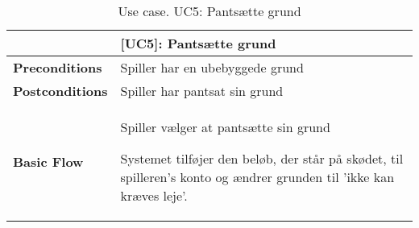 \documentclass[class=article, crop=false]{standalone}
\begin{document}
    \begin{table}[H]
        \caption{Use case. UC5: Pantsætte grund}
        \begin{tabularx}{\textwidth}{|l|X|}
            \hline
            & \textbf{[UC5]: Pantsætte grund}   \\ \hline
            \textbf{Preconditions}       & Spiller har en ubebyggede grund\\ \hline
            \textbf{Postconditions}      & Spiller har pantsat sin grund\\ \hline


            \textbf{Basic Flow} & \begin{tabenum}
                                      \item Spiller vælger at pantsætte sin grund
                                      \item Systemet tilføjer den beløb, der står på skødet, til spilleren's konto og ændrer grunden til 'ikke kan kræves leje'.
            \end{tabenum}   \\ \hline



        \end{tabularx}


    \end{table}
\end{document}
